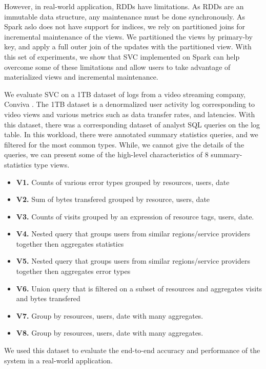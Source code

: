 However, in real-world application, RDDs have limitations.
As RDDs are an immutable data structure, any maintenance must be done synchronously.
As Spark aslo does not have support for indices, we rely on partitioned joins for incremental maintenance of the views.
We partitioned the views by primary-by key, and apply a full outer join of the updates with the partitioned view.
With this set of experiments, we show that SVC implemented on Spark can help overcome some of these limitations and allow users to take advantage of materialized views and incremental maintenance.

We evaluate SVC on a 1TB dataset of logs from a video streaming company, Conviva \cite{conviva}.
The 1TB dataset is a denormalized user activity log corresponding to video views and various metrics such as data transfer rates, and latencies.
With this dataset, there was a corresponding dataset of analyst SQL queries on the log table.
In this workload, there were annotated summary statistics queries, and we filtered for the most common types.
While, we cannot give the details of the queries, we can present some of the high-level characteristics of 8 summary-statistics type views. 
\begin{itemize} 
\item \textbf{V1.} Counts of various error types grouped by resources, users, date
\item \textbf{V2.} Sum of bytes transfered grouped by resource, users, date
\item \textbf{V3.} Counts of visits grouped by an expression of resource tags, users, date.
\item \textbf{V4.} Nested query that groups users from similar regions/service providers together then aggregates statistics
\item \textbf{V5.} Nested query that groups users from similar regions/service providers together then aggregates error types
\item \textbf{V6.} Union query that is filtered on a subset of resources and aggregates visits and bytes transfered
\item \textbf{V7.} Group by resources, users, date with many aggregates.
\item \textbf{V8.} Group by resources, users, date with many aggregates.
\end{itemize}
We used this dataset to evaluate the end-to-end accuracy and performance of the system in a real-world application.

